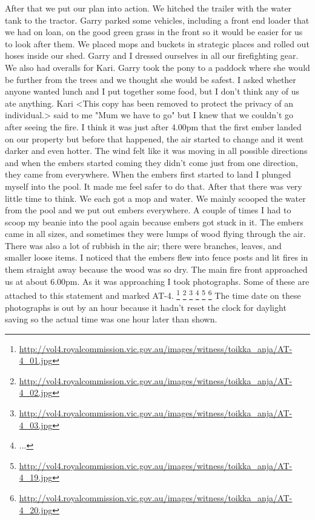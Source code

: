 \documentclass[a4paper]{article}
\begin{document}
        After that we put our plan into action. We hitched the trailer with the water tank to the tractor. Garry parked some vehicles, including a front end loader that we had on loan, on the good green grass in the front so it would be easier for us to look after them. We placed mops and buckets in strategic places and rolled out hoses inside our shed. Garry and I dressed ourselves in all our firefighting gear. We also had overalls for Kari. Garry took the pony to a paddock where she would be further from the trees and we thought she would be safest.
        I asked whether anyone wanted lunch and I put together some food, but I don't think any of us ate anything. Kari <This copy has been removed to protect the privacy of an individual.> said to me "Mum we have to go" but I knew that we couldn't go after seeing the fire.
        I think it was just after 4.00pm that the first ember landed on our property but before that happened, the air started to change and it went darker and even hotter. The wind felt like it was moving in all possible directions and when the embers started coming they didn't come just from one direction, they came from everywhere. When the embers first started to land I plunged myself into the pool. It made me feel safer to do that.
        After that there was very little time to think. We each got a mop and water. We mainly scooped the water from the pool and we put out embers everywhere. A couple of times I had to scoop my beanie into the pool again because embers got stuck in it.
        The embers came in all sizes, and sometimes they were lumps of wood flying through the air. There was also a lot of rubbish in the air; there were branches, leaves, and smaller loose items. I noticed that the embers flew into fence posts and lit fires in them straight away because the wood was so dry.
        The main fire front approached us at about 6.00pm. As it was approaching I took photographs. Some of these are attached to this statement and marked AT-4.
        \footnote{\url{http://vol4.royalcommission.vic.gov.au/images/witness/toikka_anja/AT-4_01.jpg}}
        \footnote{\url{http://vol4.royalcommission.vic.gov.au/images/witness/toikka_anja/AT-4_02.jpg}}
        \footnote{\url{http://vol4.royalcommission.vic.gov.au/images/witness/toikka_anja/AT-4_03.jpg}}
        \footnote{...}
        \footnote{\url{http://vol4.royalcommission.vic.gov.au/images/witness/toikka_anja/AT-4_19.jpg}}
        \footnote{\url{http://vol4.royalcommission.vic.gov.au/images/witness/toikka_anja/AT-4_20.jpg}}
        The time date on these photographs is out by an hour because it hadn't reset the clock for daylight saving so the actual time was one hour later than shown.
\end{document}
